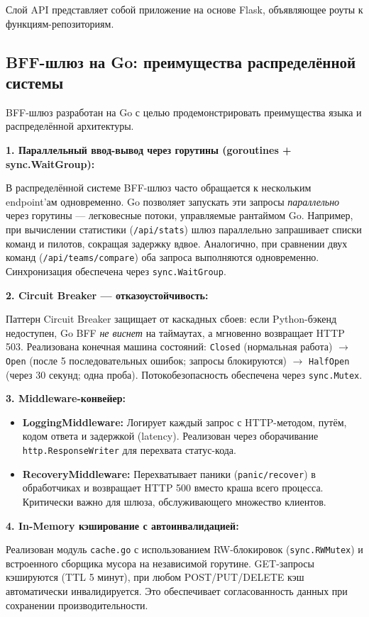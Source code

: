 \documentclass[oneside,a4paper,14pt]{extarticle}
\begin{document}
Слой API представляет собой приложение на основе Flask, объявляющее роуты к функциям-репозиториям.

\subsection*{BFF-шлюз на Go: преимущества распределённой системы}
BFF-шлюз разработан на Go с целью продемонстрировать преимущества языка и распределённой архитектуры.

\textbf{1. Параллельный ввод-вывод через горутины (goroutines + sync.WaitGroup):}

В распределённой системе BFF-шлюз часто обращается к нескольким endpoint'ам одновременно. Go позволяет запускать эти запросы \textit{параллельно} через горутины — легковесные потоки, управляемые рантаймом Go. Например, при вычислении статистики (\texttt{/api/stats}) шлюз параллельно запрашивает списки команд и пилотов, сокращая задержку вдвое. Аналогично, при сравнении двух команд (\texttt{/api/teams/compare}) оба запроса выполняются одновременно. Синхронизация обеспечена через \texttt{sync.WaitGroup}.

\textbf{2. Circuit Breaker — отказоустойчивость:}

Паттерн Circuit Breaker защищает от каскадных сбоев: если Python-бэкенд недоступен, Go BFF \textit{не виснет} на таймаутах, а мгновенно возвращает HTTP 503. Реализована конечная машина состояний: \texttt{Closed} (нормальная работа) $\to$ \texttt{Open} (после 5 последовательных ошибок; запросы блокируются) $\to$ \texttt{HalfOpen} (через 30 секунд; одна проба). Потокобезопасность обеспечена через \texttt{sync.Mutex}.

\textbf{3. Middleware-конвейер:}
\begin{itemize}
    \item[$-$] \textbf{LoggingMiddleware:} Логирует каждый запрос с HTTP-методом, путём, кодом ответа и задержкой (latency). Реализован через оборачивание \texttt{http.ResponseWriter} для перехвата статус-кода.
    \item[$-$] \textbf{RecoveryMiddleware:} Перехватывает паники (\texttt{panic/recover}) в обработчиках и возвращает HTTP 500 вместо краша всего процесса. Критически важно для шлюза, обслуживающего множество клиентов.
\end{itemize}

\textbf{4. In-Memory кэширование с автоинвалидацией:}

Реализован модуль \texttt{cache.go} с использованием RW-блокировок (\texttt{sync.RWMutex}) и встроенного сборщика мусора на независимой горутине. GET-запросы кэшируются (TTL 5 минут), при любом POST/PUT/DELETE кэш автоматически инвалидируется. Это обеспечивает согласованность данных при сохранении производительности.
\end{document}
